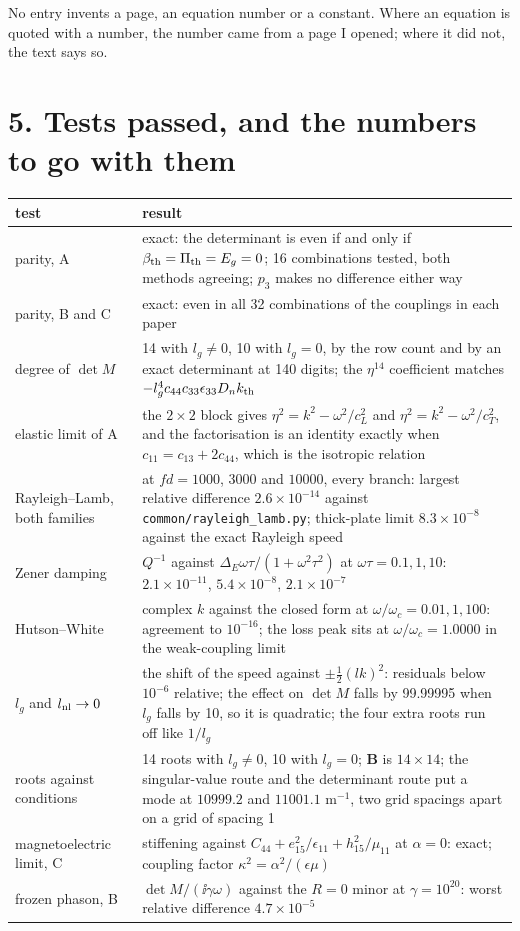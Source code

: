 \documentclass[11pt]{article}
\begin{document}
No entry invents a page, an equation number or a constant. Where an equation is quoted with a number, the
number came from a page I opened; where it did not, the text says so.

\section*{5. Tests passed, and the numbers to go with them}

\begin{center}
\begin{tabular}{p{6.6cm}p{6.6cm}}
\toprule
test & result\\
\midrule
parity, A & exact: the determinant is even if and only if $\beta_{\rm th}=\Pi_{\rm th}=E_g=0$; 16
combinations tested, both methods agreeing; $p_3$ makes no difference either way\\
parity, B and C & exact: even in all 32 combinations of the couplings in each paper\\
degree of $\det M$ & 14 with $l_g\ne0$, 10 with $l_g=0$, by the row count and by an exact determinant at
140 digits; the $\eta^{14}$ coefficient matches $-l_g^4c_{44}c_{33}\epsilon_{33}D_nk_{\rm th}$\\
elastic limit of A & the $2\times2$ block gives $\eta^2=k^2-\omega^2/c_L^2$ and $\eta^2=k^2-\omega^2/c_T^2$,
and the factorisation is an identity exactly when $c_{11}=c_{13}+2c_{44}$, which is the isotropic relation\\
Rayleigh--Lamb, both families & at $fd=1000$, $3000$ and $10000$, every branch: largest relative
difference $2.6\times10^{-14}$ against \texttt{common/rayleigh\_lamb.py}; thick-plate limit $8.3\times10^{-8}$
against the exact Rayleigh speed\\
Zener damping & $Q^{-1}$ against $\Delta_E\omega\tau/(1+\omega^2\tau^2)$ at $\omega\tau=0.1,1,10$:
$2.1\times10^{-11}$, $5.4\times10^{-8}$, $2.1\times10^{-7}$\\
Hutson--White & complex $k$ against the closed form at $\omega/\omega_c=0.01,1,100$: agreement to
$10^{-16}$; the loss peak sits at $\omega/\omega_c=1.0000$ in the weak-coupling limit\\
$l_g$ and $l_{\rm nl}\to0$ & the shift of the speed against $\pm\frac12(lk)^2$: residuals below
$10^{-6}$ relative; the effect on $\det M$ falls by 99.99995 when $l_g$ falls by 10, so it is quadratic;
the four extra roots run off like $1/l_g$\\
roots against conditions & 14 roots with $l_g\ne0$, 10 with $l_g=0$; $\mathbf B$ is $14\times14$; the
singular-value route and the determinant route put a mode at $10999.2$ and $11001.1$ m$^{-1}$, two grid
spacings apart on a grid of spacing 1\\
magnetoelectric limit, C & stiffening against $C_{44}+e_{15}^2/\epsilon_{11}+h_{15}^2/\mu_{11}$ at
$\alpha=0$: exact; coupling factor $\kappa^2=\alpha^2/(\epsilon\mu)$\\
frozen phason, B & $\det M/(\ii\gamma\omega)$ against the $R=0$ minor at $\gamma=10^{20}$: worst
relative difference $4.7\times10^{-5}$\\
\bottomrule
\end{tabular}
\end{center}
\end{document}
